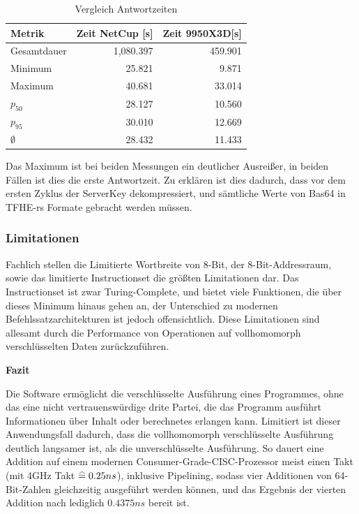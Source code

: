 \begin{table}[h!]
    \centering
    \begin{tabular}{|l|r|r|}
        \hline
        \textbf{Metrik} & \textbf{Zeit NetCup [s]} & \textbf{Zeit 9950X3D[s]} \\ \hline
        Gesamtdauer     & 1,080.397                & 459.901                  \\ \hline
        Minimum         & 25.821                   & 9.871                    \\ \hline
        Maximum         & 40.681                   & 33.014                   \\ \hline
        $p_{50}$        & 28.127                   & 10.560                   \\ \hline
        $p_{95}$        & 30.010                   & 12.669                   \\ \hline
        $\emptyset$     & 28.432                   & 11.433                   \\ \hline
    \end{tabular}
    \caption{Vergleich Antwortzeiten}
    \label{tab:response_times}
\end{table}

Das Maximum ist bei beiden Messungen ein deutlicher Ausreißer, in beiden Fällen ist dies die erste Antwortzeit.
Zu erklären ist dies dadurch, dass vor dem ersten Zyklus der ServerKey dekompressiert, und sämtliche Werte von Bas64 in TFHE-rs Formate gebracht werden müssen.

\subsubsection{Limitationen}
Fachlich stellen die Limitierte Wortbreite von 8-Bit, der 8-Bit-Addressraum, sowie das limitierte Instructionset die größten Limitationen dar.
Das Instructionset ist zwar Turing-Complete, und bietet viele Funktionen, die über dieses Minimum hinaus gehen an,
der Unterschied zu modernen Befehlssatzarchitekturen ist jedoch offensichtlich.
Diese Limitationen sind allesamt durch die Performance von Operationen auf vollhomomorph verschlüsselten Daten zurückzuführen.

\textbf{Fazit}

Die Software ermöglicht die verschlüsselte Ausführung eines Programmes,
ohne das eine nicht vertrauenswürdige drite Partei,
die das Programm ausführt Informationen über Inhalt oder berechnetes erlangen kann.
Limitiert ist dieser Anwendungsfall dadurch, dass die vollhomomorph verschlüsselte Ausführung deutlich langsamer ist,
als die unverschlüsselte Ausführung.
So dauert eine Addition auf einem modernen Consumer-Grade-CISC-Prozessor meist einen Takt (mit 4GHz Takt $\equalhat 0.25ns$), inklusive Pipelining,
sodass vier Additionen von 64-Bit-Zahlen gleichzeitig ausgeführt werden können, und das Ergebnis der vierten Addition nach lediglich $0.4375ns$ bereit ist.

